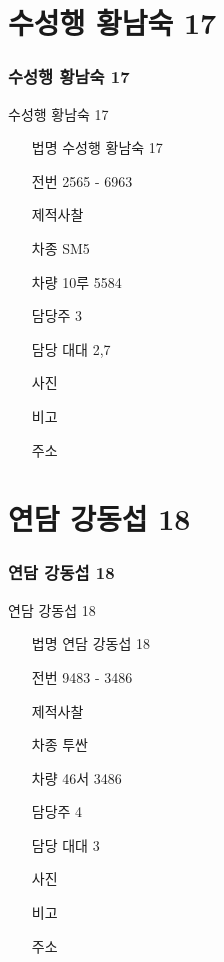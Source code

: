 \documentclass[aspectratio=1610,17pt,xcolor=pdftex,dvipsnames,table,handout]{beamer}
\begin{document}
		\section{ 수성행	황남숙 17}
		\begin{frame} [t,plain]
		\frametitle{수성행	황남숙 17}
			\begin{block} {수성행	황남숙 17}
			\setlength{\leftmargini}{6em}			
			\begin{itemize}
				\item [법명]			수성행	황남숙 17
				\item [전번]			2565 - 6963
				\item [제적사찰]
				\item [차종]			SM5
				\item [차량]			10루 5584
				\item [담당주]		3
				\item [담당 대대]	2,7
				\item [사진]			%
				\item [비고]			
				\item [주소] 
			\end{itemize}

			\end{block}						
		\end{frame}					
	
		\section{ 연담	강동섭 18	}
		\begin{frame} [t,plain]
		\frametitle{ 연담	강동섭 18	}
			\begin{block} {연담	강동섭 18	}
			\setlength{\leftmargini}{6em}			
			\begin{itemize}
				\item [법명]			연담	강동섭 18	
				\item [전번]			9483 - 3486
				\item [제적사찰]
				\item [차종]			투싼
				\item [차량]			46서 3486
				\item [담당주]		4
				\item [담당 대대]	3
				\item [사진]			%
				\item [비고]			
				\item [주소] 
			\end{itemize}

			\end{block}						
		\end{frame}					
\end{document}
